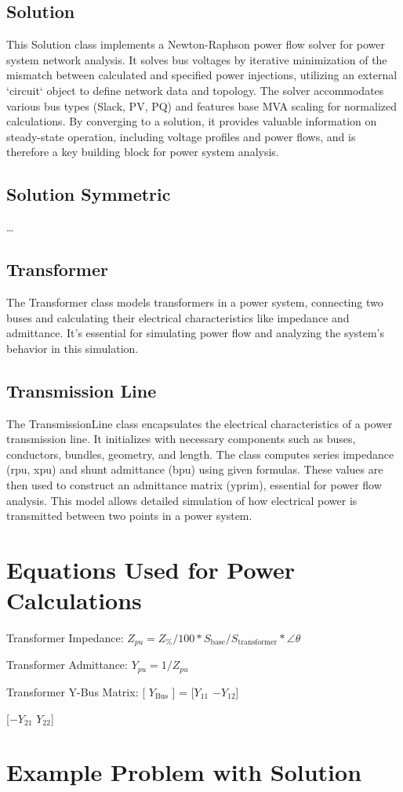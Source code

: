 \documentclass{article}
\begin{document}
	\subsection{Solution}
	This Solution class implements a Newton-Raphson power flow solver for power system network analysis. It solves bus voltages by iterative minimization of the mismatch between calculated and specified power injections, utilizing an external `circuit` object to define network data and topology. The solver accommodates various bus types (Slack, PV, PQ) and features base MVA scaling for normalized calculations. By converging to a solution, it provides valuable information on steady-state operation, including voltage profiles and power flows, and is therefore a key building block for power system analysis.

	\subsection{Solution Symmetric}
	\dots	
	
	\subsection{Transformer}
	The Transformer class models transformers in a power system, connecting two buses and calculating their electrical characteristics like impedance and admittance. It's essential for simulating power flow and analyzing the system's behavior in this simulation.
	
	\subsection{Transmission Line}
	The TransmissionLine class encapsulates the electrical characteristics of a power transmission line. It initializes with necessary components such as buses, conductors, bundles, geometry, and length. The class computes series impedance (rpu, xpu) and shunt admittance (bpu) using given formulas. These values are then used to construct an admittance matrix (yprim), essential for power flow analysis. This model allows detailed simulation of how electrical power is transmitted between two points in a power system.
	
	\section{Equations Used for Power Calculations}
	\noindent
	Transformer Impedance: $Z_{pu} = Z_\% / 100 * S_{\text{base}} / S_{\text{transformer}} * \angle{\theta}$
	
	\noindent
	Transformer Admittance: $Y_{pu} = 1 / Z_{pu}$
	
	\noindent
	Transformer Y-Bus Matrix: [ $Y_{\text{Bus}}$ ] = [$Y_{11}$ $-Y_{12}$]
	
	\noindent
	\phantom{Transformer Y-Bus Matrix: [ $Y_{Bus}$ ] = }[$-Y_{21}$ $Y_{22}$]
	
	\section{Example Problem with Solution}
	
\end{document}
